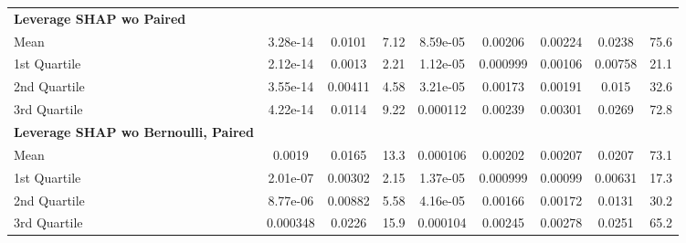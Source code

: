 {\begin{tabular} {lcccccccc}
\addlinespace[1ex] 
\textbf{Leverage SHAP wo Paired} &  &  &  &  &  &  &  &  \\ 
\hspace{7pt}Mean & \cellcolor{gold!60}3.28e-14 & 0.0101 & 7.12 & 8.59e-05 & 0.00206 & 0.00224 & 0.0238 & 75.6 \\ 
\hspace{7pt}1st Quartile & \cellcolor{bronze!60}2.12e-14 & 0.0013 & 2.21 & 1.12e-05 & 0.000999 & 0.00106 & 0.00758 & 21.1 \\ 
\hspace{7pt}2nd Quartile & \cellcolor{silver!60}3.55e-14 & 0.00411 & 4.58 & 3.21e-05 & 0.00173 & 0.00191 & 0.015 & 32.6 \\ 
\hspace{7pt}3rd Quartile & \cellcolor{silver!60}4.22e-14 & 0.0114 & 9.22 & 0.000112 & 0.00239 & 0.00301 & 0.0269 & 72.8 \\ 
\addlinespace[1ex] 
\textbf{Leverage SHAP wo Bernoulli, Paired} &  &  &  &  &  &  &  &  \\ 
\hspace{7pt}Mean & 0.0019 & 0.0165 & 13.3 & 0.000106 & 0.00202 & 0.00207 & 0.0207 & 73.1 \\ 
\hspace{7pt}1st Quartile & 2.01e-07 & 0.00302 & 2.15 & 1.37e-05 & 0.000999 & 0.00099 & 0.00631 & 17.3 \\ 
\hspace{7pt}2nd Quartile & 8.77e-06 & 0.00882 & 5.58 & 4.16e-05 & 0.00166 & 0.00172 & 0.0131 & 30.2 \\ 
\hspace{7pt}3rd Quartile & 0.000348 & 0.0226 & 15.9 & 0.000104 & 0.00245 & 0.00278 & 0.0251 & 65.2 \\ 
\bottomrule
\end{tabular}}
